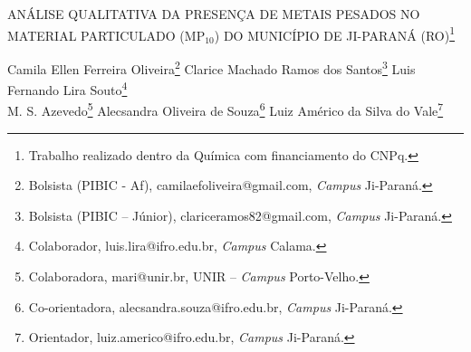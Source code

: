 \documentclass[article,12pt,onesidea,4paper,english,brazil]{abntex2}
\begin{document}
	
	
	\frenchspacing 
	
	\begin{center}
		\LARGE ANÁLISE QUALITATIVA DA PRESENÇA DE METAIS PESADOS NO MATERIAL		
		PARTICULADO (MP$_{10}$) DO MUNICÍPIO DE JI-PARANÁ (RO)\footnote{Trabalho realizado dentro da Química com financiamento do CNPq.}
		
		\normalsize
		Camila Ellen Ferreira Oliveira\footnote{Bolsista (PIBIC - Af), camilaefoliveira@gmail.com, \textit{Campus} Ji-Paraná.} 
		Clarice Machado Ramos dos Santos\footnote{Bolsista (PIBIC – Júnior), clariceramos82@gmail.com, \textit{Campus} Ji-Paraná.} 
		Luis Fernando Lira Souto\footnote{Colaborador, luis.lira@ifro.edu.br, \textit{Campus} Calama.} \\
		M. S. Azevedo\footnote{Colaboradora, mari@unir.br, UNIR – \textit{Campus} Porto-Velho.}
		Alecsandra Oliveira de Souza\footnote{Co-orientadora, alecsandra.souza@ifro.edu.br, \textit{Campus} Ji-Paraná.}
		Luiz Américo da Silva do Vale\footnote{Orientador, luiz.americo@ifro.edu.br, \textit{Campus} Ji-Paraná.} 
	\end{center}
	
\end{document}

